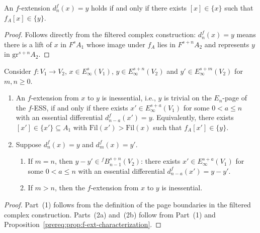 \begin{proposition}\label{prereq:prop:f-ext-characterization}
    \leanok
    An $f$-extension $d_n^f(x) = y$ holds if and only if there exists $[x] \in \{x\}$ such that $f_A[x] \in \{y\}$.
\end{proposition}
\begin{proof} Follows directly from the filtered complex construction: $d_n^f(x) = y$ means there is a lift of $x$ in $F^s A_1$ whose image under $f_A$ lies in $F^{s+n} A_2$ and represents $y$ in $\mathrm{gr}^{s+n} A_2$.  %
\end{proof}

\begin{proposition}\label{prereq:prop:f-ext-inessential}
    \leanok
    Consider $f: V_1 \to V_2$, $x \in E_\infty^{s}(V_1)$, $y \in E_\infty^{s+n}(V_2)$ and $y' \in E_\infty^{s+m}(V_2)$ for $m, n \ge 0$.
    \begin{enumerate}
        \item An $f$-extension from $x$ to $y$ is inessential, i.e., $y$ is trivial on the $E_n$-page of the $f$-ESS, if and only if there exists $x' \in E_\infty^{s+a}(V_1)$ for some $0 < a \le n$ with an essential differential $d_{n-a}^f(x') = y$. Equivalently, there exists $[x'] \in \{x'\} \subseteq A_1$ with $\mathrm{Fil}(x') > \mathrm{Fil}(x)$ such that $f_A[x'] \in \{y\}$.
        \item Suppose $d_n^f(x) = y$ and $d_m^f(x) = y'$.
        \begin{enumerate}
            \item If $m = n$, then $y - y' \in {}^f\!B_{n-1}^{s+n}(V_2)$: there exists $x' \in E_\infty^{s+a}(V_1)$ for some $0 < a \le n$ with an essential differential $d_{n-a}^f(x') = y - y'$.
            \item If $m > n$, then the $f$-extension from $x$ to $y$ is inessential.
        \end{enumerate}
    \end{enumerate}
\end{proposition}
\begin{proof} Part~(1) follows from the definition of the page boundaries in the filtered complex construction. Parts~(2a) and~(2b) follow from Part~(1) and Proposition~\ref{prereq:prop:f-ext-characterization}.  %
\end{proof}

